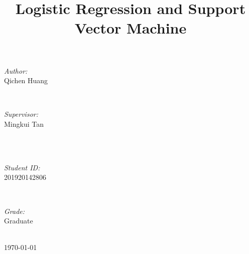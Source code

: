 \documentclass[journal, a4paper]{IEEEtran}
\begin{document}
\begin{titlepage}
\begin{minipage}{0.4\textwidth}
\begin{flushleft} \large
\emph{Author:}\\
Qichen Huang %
\end{flushleft}
\end{minipage}
~
\begin{minipage}{0.4\textwidth}
\begin{flushright} \large
\emph{Supervisor:} \\
Mingkui Tan%
\end{flushright}
\end{minipage}\\[2cm]
~
\begin{minipage}{0.4\textwidth}
\begin{flushleft} \large
\emph{Student ID:}\\
201920142806
\end{flushleft}
\end{minipage}
~
\begin{minipage}{0.4\textwidth}
\begin{flushright} \large
\emph{Grade:} \\
Graduate
\end{flushright}
\end{minipage}\\[2cm]



{\large \today}\\[2cm] %



\vfill %

\end{titlepage}

	\title{Logistic Regression and Support Vector Machine}
	\maketitle
\end{document}
